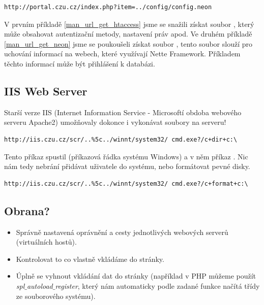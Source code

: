 \documentclass[12pt, a4paper]{report}
\begin{document}
\begin{lstlisting}[label=man_url_get_neon,caption=Manipulace s URL - získání config.neon]
http://portal.czu.cz/index.php?item=../config/config.neon
\end{lstlisting}

V prvním příkladě \ref{man_url_get_htaccess} jsme se snažili získat soubor , který může obsahovat autentizační metody, nastavení práv apod. Ve druhém příkladě \ref{man_url_get_neon} jsme se poukoušeli získat soubor , tento soubor slouží pro uchování  informací na webech, které využívají Nette Framework. Příkladem těchto informací může být přihlášení k databázi.

\subsection{IIS Web Server}
Starší verze IIS (Internet Information Service - Microsoftí obdoba webového serveru Apache2) umožňovaly dokonce i vykonávat soubory na serveru!

\begin{lstlisting}[label=iis_derave,caption=Ukázka URL pro \uv{děravé} IIS]
http://iis.czu.cz/scr/..%5c../winnt/system32/ cmd.exe?/c+dir+c:\
\end{lstlisting}

Tento příkaz spustil  (příkazová řádka systému Windows) a v něm příkaz . Nic nám tedy nebrání přidávat uživatele do systému, nebo formátovat pevné disky.

\begin{lstlisting}[label=iis_derave_format,caption=Formátování disku C: přes chybu v IIS]
http://iis.czu.cz/scr/..%5c../winnt/system32/ cmd.exe?/c+format+c:\
\end{lstlisting}

\subsection{Obrana?}
\begin{itemize}
\item Správně nastavená oprávnění a cesty jednotlivých webových serverů (virtuálních hostů).
\item Kontrolovat to co vlastně vkládáme do stránky.
\item Úplně se vyhnout vkládání dat do stránky (například v PHP můžeme použít \textit{spl$\_$autoload$\_$register}, který nám automaticky podle zadané funkce načítá třídy ze souborového systému).
\end{itemize}
\end{document}
